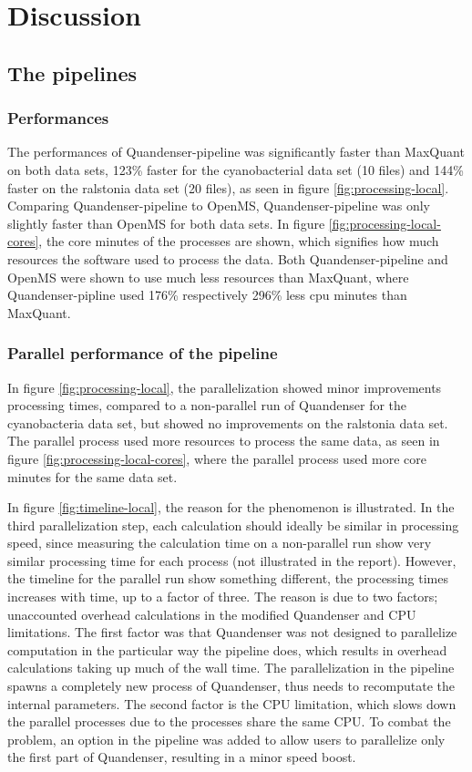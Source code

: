 \section{Discussion}

\subsection{The pipelines}

\subsubsection{Performances}
The performances of Quandenser-pipeline was significantly faster than MaxQuant on both data sets, 123\% faster for the cyanobacterial data set (10 files) and 144\% faster on the ralstonia data set (20 files), as seen in figure \ref{fig:processing-local}. Comparing Quandenser-pipeline to OpenMS, Quandenser-pipeline was only slightly faster than OpenMS for both data sets. In figure \ref{fig:processing-local-cores}, the core minutes of the processes are shown, which signifies how much resources the software used to process the data. Both Quandenser-pipeline and OpenMS were shown to use much less resources than MaxQuant, where Quandenser-pipline used 176\% respectively 296\% less cpu minutes than MaxQuant.

\subsubsection{Parallel performance of the pipeline}
In figure \ref{fig:processing-local}, the parallelization showed minor improvements processing times, compared to a non-parallel run of Quandenser for the cyanobacteria data set, but showed no improvements on the ralstonia data set. The parallel process used more resources to process the same data, as seen in figure \ref{fig:processing-local-cores}, where the parallel process used more core minutes for the same data set.

In figure \ref{fig:timeline-local}, the reason for the phenomenon is illustrated. In the third parallelization step, each calculation should ideally be similar in processing speed, since measuring the calculation time on a non-parallel run show very similar processing time for each process (not illustrated in the report). However, the timeline for the parallel run show something different, the processing times increases with time, up to a factor of three. The reason is due to two factors; unaccounted overhead calculations in the modified Quandenser and CPU limitations. The first factor was that Quandenser was not designed to parallelize computation in the particular way the pipeline does, which results in overhead calculations taking up much of the wall time. The parallelization in the pipeline spawns a completely new process of Quandenser, thus needs to recomputate the internal parameters. The second factor is the CPU limitation, which slows down the parallel processes due to the processes share the same CPU. To combat the problem, an option in the pipeline was added to allow users to parallelize only the first part of Quandenser, resulting in a minor speed boost.

